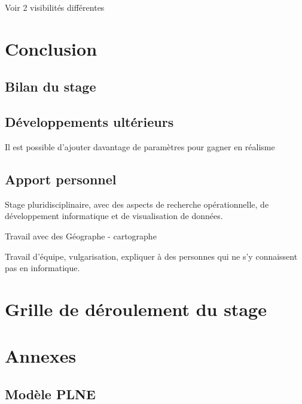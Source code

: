 \documentclass[a4paper,12pt,french]{article}
\begin{document}
Voir 2 visibilités différentes


\section{Conclusion}

\subsection{Bilan du stage}

\subsection{Développements ultérieurs}

Il est possible d'ajouter davantage de paramètres pour gagner en réalisme

\subsection{Apport personnel}

Stage pluridisciplinaire, avec des aspects de recherche opérationnelle, de développement informatique et de visualisation de données.

Travail avec des Géographe - cartographe

Travail d'équipe, vulgarisation, expliquer à des personnes qui ne s'y connaissent pas en informatique.

\section{Grille de déroulement du stage}



\newpage
\printbibliography[
heading=bibintoc,
title={Bibliographie}
]

\newpage
\section*{Annexes}

\subsection*{Modèle PLNE}

\end{document}
